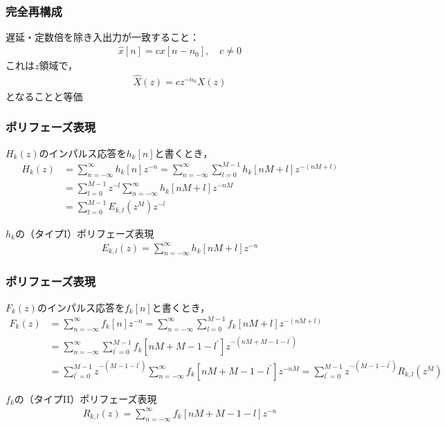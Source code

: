 \documentclass[14pt,xcolor=dvipsnames,table,dvipdfmx]{beamer}
\begin{document}
\begin{frame}[c]
    \frametitle{完全再構成}
    遅延・定数倍を除き入出力が一致すること：
    \begin{align}
        \hat{x}[n] = c x[n - n_{0}], \quad c \neq 0
    \end{align}
    これは$z$領域で，
    \begin{align}
        \hat{X}(z) = c z^{-n_{0}} X(z)
    \end{align}
    となることと等価
\end{frame}

\begin{frame}[c]
    \frametitle{ポリフェーズ表現}
    $H_{k}(z)$のインパルス応答を$h_{k}[n]$と書くとき，
    \small
    \begin{align*}
        H_{k}(z) &= \sum_{n = -\infty}^{\infty} h_{k}[n] z^{-n} = \sum_{n = -\infty}^{\infty} \sum_{l = 0}^{M - 1} h_{k}[nM + l] z^{-(nM+l)} \\
        &= \sum_{l = 0}^{M - 1} z^{-l} \sum_{n = -\infty}^{\infty}h_{k}[nM + l] z^{-nM} \\
        &= \sum_{l = 0}^{M - 1} E_{k,l}(z^{M}) z^{-l}
    \end{align*}
    \normalsize
    \begin{block}{$h_{k}$の（タイプI）ポリフェーズ表現}
        \vspace{-13pt}
        \begin{align}
            E_{k,l}(z) = \sum_{n = -\infty}^{\infty} h_{k}[nM + l] z^{-n} \label{eq:type1_polyphase_representation}
        \end{align}
    \end{block}
\end{frame}

\begin{frame}[c]
    \frametitle{ポリフェーズ表現}
    $F_{k}(z)$のインパルス応答を$f_{k}[n]$と書くとき，
    \scriptsize
    \begin{align*}
        F_{k}(z) &= \sum_{n = -\infty}^{\infty} f_{k}[n] z^{-n} = \sum_{n = -\infty}^{\infty} \sum_{l = 0}^{M - 1} f_{k}[nM + l] z^{-(nM+l)} \\
        &= \sum_{n = -\infty}^{\infty} \sum_{l^{\prime} = 0}^{M - 1} f_{k}[nM + M - 1 - l^{\prime}] z^{-(nM + M - 1 - l^{\prime})} \\
        &= \sum_{l^{\prime} = 0}^{M - 1} z^{-(M - 1 - l^{\prime})} \sum_{n = -\infty}^{\infty} f_{k}[nM + M - 1 - l^{\prime}] z^{-nM} = \sum_{l^{\prime} = 0}^{M - 1} z^{-(M - 1 - l^{\prime})} R_{k,l}(z^{M})
    \end{align*}
    \normalsize
    \begin{block}{$f_{k}$の（タイプII）ポリフェーズ表現}
        \vspace{-13pt}
        \begin{align}
            R_{k,l}(z) = \sum_{n = -\infty}^{\infty} f_{k}[nM + M - 1 - l] z^{-n} \label{eq:type2_polyphase_representation}
        \end{align}
    \end{block}
\end{frame}
\end{document}
